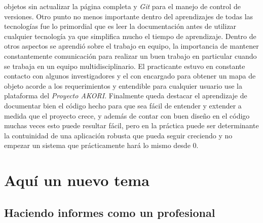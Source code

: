 { 	objetos sin actualizar la página completa y \textit{Git} para el manejo de control de versiones.
 	Otro punto no menos importante dentro del aprendizajes de todas las tecnologías fue lo 
 	primordial que es leer la documentación antes de utilizar cualquier tecnología ya que 
 	simplifica mucho el tiempo de aprendizaje. Dentro de otros aspectos se aprendió sobre el
 	trabajo en equipo, la importancia de mantener constantemente comunicación para realizar un 
 	buen trabajo en particular cuando se trabaja en un equipo multidisciplinario. El practicante
 	estuvo en constante contacto con algunos investigadores y el con encargado para obtener un 
 	mapa de objeto acorde a los requerimientos y entendible para cualquier usuario use la 
 	plataforma del \textit{Proyecto AKORI}. Finalmente queda destacar el aprendizaje de documentar
 	bien el código hecho para que sea fácil de entender y extender a medida que el proyecto crece, 
 	y además de contar con buen diseño en el código muchas veces esto puede resultar fácil, pero
 	en la práctica puede ser determinante la contuinidad de una aplicación robusta que pueda seguir
 	creciendo y no empezar un sistema que prácticamente hará lo mismo desde 0.}

\newpage
\section{Aquí un nuevo tema}
	
	\subsection{Haciendo informes como un profesional}
		
		
		\lipsum[1]

		\newp \lipsum[115]
		\newp \lipsum[2]
		
		
